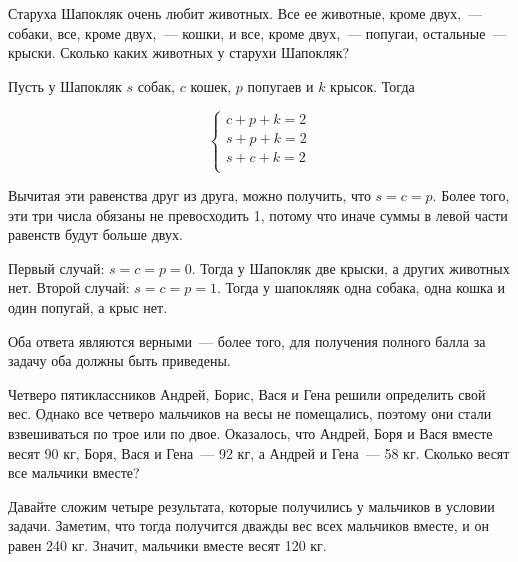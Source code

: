 

\begin{itemize}
\itA Старуха Шапокляк очень любит животных. Все ее животные, кроме двух,~— собаки, все, кроме двух,~— кошки, и все, кроме двух,~— попугаи, остальные~— крыски. Сколько каких животных у старухи Шапокляк?

\itr Пусть у Шапокляк $s$ собак, $c$ кошек, $p$ попугаев и $k$ крысок. Тогда

$$
\begin{cases}
c+p+k = 2 \\
s+p+k = 2 \\
s+c+k = 2 \\
\end{cases}
$$

Вычитая эти равенства друг из друга, можно получить, что $s=c=p$. Более того, эти три числа обязаны не превосходить 1, потому что иначе суммы в левой части равенств будут больше двух.

Первый случай: $s=c=p=0$. Тогда у Шапокляк две крыски, а других животных нет. Второй случай: $s=c=p=1$. Тогда у шапокляяк одна собака, одна кошка и один попугай, а крыс нет.

Оба ответа являются верными~— более того, для получения полного балла за задачу оба должны быть приведены.

\itB Четверо пятиклассников Андрей, Борис, Вася и Гена решили определить свой вес. Однако  все четверо мальчиков на весы не помещались, поэтому они стали взвешиваться по трое или по двое. Оказалось, что Андрей, Боря и Вася вместе весят 90 кг, Боря, Вася и Гена~— 92 кг, а Андрей и Гена~— 58 кг. Сколько весят все мальчики вместе?

\itr Давайте сложим четыре результата, которые получились у мальчиков в условии задачи. Заметим, что тогда получится дважды вес всех мальчиков вместе, и он равен 240 кг. Значит, мальчики вместе весят 120 кг.

\end{itemize}



